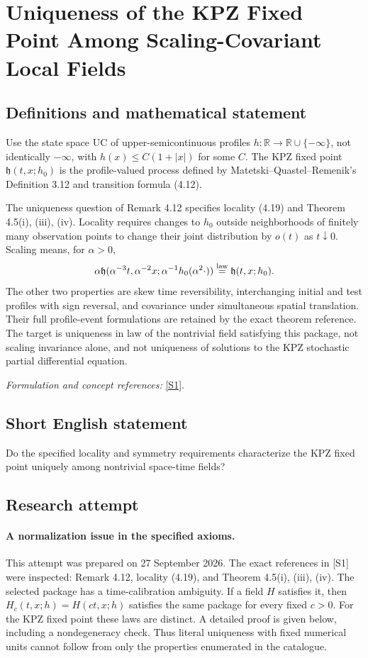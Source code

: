 \documentclass[11pt]{article}
\begin{document}
\section*{\texorpdfstring{Uniqueness of the KPZ Fixed Point Among Scaling-Covariant Local Fields}{Uniqueness of the KPZ Fixed Point Among Scaling-Covariant Local Fields}}\label{statement}
\subsection{Definitions and mathematical statement}
Use the state space $\mathrm{UC}$ of upper-semicontinuous profiles $h:{\mathbb{R}}\to{\mathbb{R}}\cup\{-\infty\}$, not identically $-\infty$, with $h(x)\le C(1+|x|)$ for some $C$. The KPZ fixed point $\mathfrak h(t,x;h_0)$ is the profile-valued process defined by Matetski--Quastel--Remenik's Definition 3.12 and transition formula (4.12).

The uniqueness question of Remark 4.12 specifies locality (4.19) and Theorem 4.5(i), (iii), (iv). Locality requires changes to $h_0$ outside neighborhoods of finitely many observation points to change their joint distribution by $o(t)$ as $t\downarrow0$. Scaling means, for $\alpha>0$,
\[
 \alpha\mathfrak h(\alpha^{-3}t,\alpha^{-2}x;
       \alpha^{-1}h_0(\alpha^2\cdot))
 \overset{\rm law}=\mathfrak h(t,x;h_0).
\]
The other two properties are skew time reversibility, interchanging initial and test profiles with sign reversal, and covariance under simultaneous spatial translation. Their full profile-event formulations are retained by the exact theorem reference. The target is uniqueness in law of the nontrivial field satisfying this package, not scaling invariance alone, and not uniqueness of solutions to the KPZ stochastic partial differential equation.
\par\smallskip\textit{Formulation and concept references:} \href{https://arxiv.org/html/1701.00018v3}{[S1]}.

\subsection{Short English statement}
Do the specified locality and symmetry requirements characterize the KPZ fixed point uniquely among nontrivial space-time fields?
\subsection{Research attempt}
\paragraph{A normalization issue in the specified axioms.}
This attempt was prepared on 27 September 2026. The exact references in
[S1] were inspected: Remark 4.12, locality (4.19), and Theorem 4.5(i),
(iii), (iv). The selected package has a time-calibration ambiguity.
If a field $H$ satisfies it, then $H_c(t,x;h)=H(ct,x;h)$ satisfies the
same package for every fixed $c>0$. For the KPZ fixed point these laws
are distinct. A detailed proof is given below, including a nondegeneracy
check. Thus literal uniqueness with fixed numerical units cannot follow
from only the properties enumerated in the catalogue.
\end{document}
